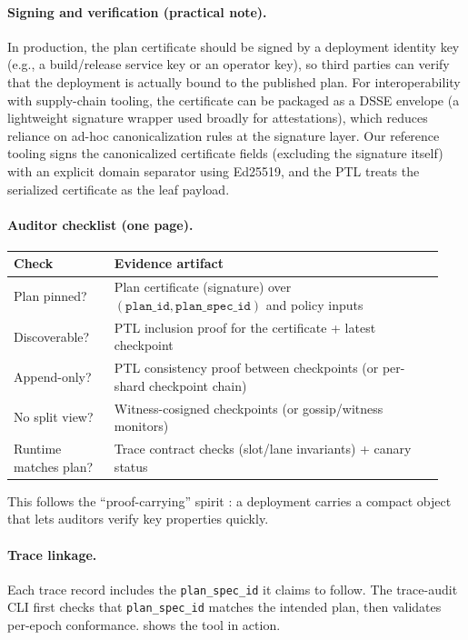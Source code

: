 \documentclass[11pt]{article}
\begin{document}
\paragraph{Signing and verification (practical note).}
In production, the plan certificate should be signed by a deployment identity key (e.g., a build/release service key or an operator key), so third parties can verify that the deployment is actually bound to the published plan.
For interoperability with supply-chain tooling, the certificate can be packaged as a DSSE envelope (a lightweight signature wrapper used broadly for attestations), which reduces reliance on ad-hoc canonicalization rules at the signature layer.\cite{dsseSpec,slsaAttestationModelV12}
Our reference tooling signs the canonicalized certificate fields (excluding the signature itself) with an explicit domain separator using Ed25519, and the PTL treats the serialized certificate as the leaf payload.


\paragraph{Auditor checklist (one page).}
\begin{center}
\begin{tabular}{@{}L{0.22\linewidth}L{0.72\linewidth}@{}}
\toprule
Check & Evidence artifact \\
\midrule
Plan pinned? & Plan certificate (signature) over $(\texttt{plan\_id},\texttt{plan\_spec\_id})$ and policy inputs \\
Discoverable? & PTL inclusion proof for the certificate + latest checkpoint \\
Append-only? & PTL consistency proof between checkpoints (or per-shard checkpoint chain) \\
No split view? & Witness-cosigned checkpoints (or gossip/witness monitors) \\
Runtime matches plan? & Trace contract checks (slot/lane invariants) + canary status \\
\bottomrule
\end{tabular}
\end{center}

This follows the ``proof-carrying'' spirit \cite{neculaPCC97}: a deployment carries a compact object that lets auditors verify key properties quickly.

\paragraph{Trace linkage.}
Each trace record includes the \texttt{plan\_spec\_id} it claims to follow.
The trace-audit CLI first checks that \texttt{plan\_spec\_id} matches the intended plan, then validates per-epoch conformance.
 shows the tool in action.
\end{document}
